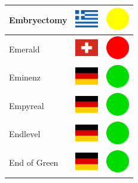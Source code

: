 \documentclass[12pt, a4paper, twoside]{report}
\begin{document}
\begin{center}
\begin{longtable}{|p{5cm}|p{2cm}|p{2cm}|}
Embryectomy & \includegraphics[width=1cm]{4x3/gr} & \includegraphics[width=1cm]{likes/m} \\ \hline
Emerald & \includegraphics[width=1cm]{4x3/ch} & \includegraphics[width=1cm]{likes/n} \\ \hline
Eminenz & \includegraphics[width=1cm]{4x3/de} & \includegraphics[width=1cm]{likes/y} \\ \hline
Empyreal & \includegraphics[width=1cm]{4x3/de} & \includegraphics[width=1cm]{likes/y} \\ \hline
Endlevel & \includegraphics[width=1cm]{4x3/de} & \includegraphics[width=1cm]{likes/y} \\ \hline
End of Green & \includegraphics[width=1cm]{4x3/de} & \includegraphics[width=1cm]{likes/y} \\ \hline

\end{longtable}
\end{center}
\end{document}
